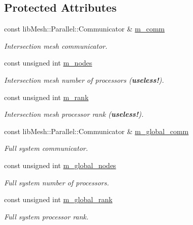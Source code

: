 \subsection*{Protected Attributes}
\begin{DoxyCompactItemize}
\item 
const lib\+Mesh\+::\+Parallel\+::\+Communicator \& \hyperlink{classcarl_1_1_mesh___intersection_a418cf274a01b6aea560249a468574124}{m\+\_\+comm}
\begin{DoxyCompactList}\small\item\em Intersection mesh communicator. \end{DoxyCompactList}\item 
const unsigned int \hyperlink{classcarl_1_1_mesh___intersection_abd9e70d02d26302a6cc97fc4ec4990dc}{m\+\_\+nodes}
\begin{DoxyCompactList}\small\item\em Intersection mesh number of processors ({\bfseries useless!}). \end{DoxyCompactList}\item 
const unsigned int \hyperlink{classcarl_1_1_mesh___intersection_ab2543dd7c6f2d62561e4b75782621f43}{m\+\_\+rank}
\begin{DoxyCompactList}\small\item\em Intersection mesh processor rank ({\bfseries useless!}). \end{DoxyCompactList}\item 
const lib\+Mesh\+::\+Parallel\+::\+Communicator \& \hyperlink{classcarl_1_1_mesh___intersection_abe420c1736bc43ea710f2f92073e91b9}{m\+\_\+global\+\_\+comm}
\begin{DoxyCompactList}\small\item\em Full system communicator. \end{DoxyCompactList}\item 
const unsigned int \hyperlink{classcarl_1_1_mesh___intersection_ad033bd5e13ceafadbfee32998f56f5a4}{m\+\_\+global\+\_\+nodes}
\begin{DoxyCompactList}\small\item\em Full system number of processors. \end{DoxyCompactList}\item 
const unsigned int \hyperlink{classcarl_1_1_mesh___intersection_a9f045e850a4b8ecbcc2e044a2c987009}{m\+\_\+global\+\_\+rank}
\begin{DoxyCompactList}\small\item\em Full system processor rank. \end{DoxyCompactList}\item 

\end{DoxyCompactItemize}
